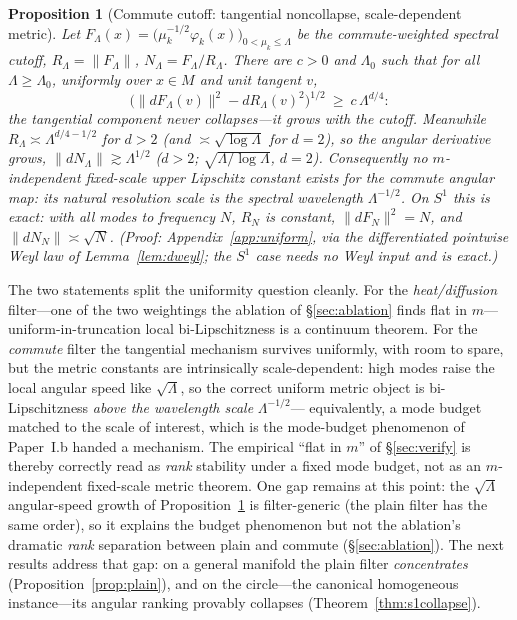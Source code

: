 \documentclass[11pt]{article}
\newtheorem{proposition}[theorem]{Proposition}
\theoremstyle{remark}
\begin{document}
\begin{proposition}[Commute cutoff: tangential noncollapse, scale-dependent metric]\label{prop:weyl}
Let $F_\Lambda(x)=\big(\mu_k^{-1/2}\varphi_k(x)\big)_{0<\mu_k\le\Lambda}$
be the commute-weighted spectral cutoff, $R_\Lambda=\lVert F_\Lambda\rVert$,
$N_\Lambda=F_\Lambda/R_\Lambda$. There are $c>0$ and $\Lambda_0$ such that for
all $\Lambda\ge\Lambda_0$, uniformly over $x\in M$ and unit tangent $v$,
\[
\big(\lVert dF_\Lambda(v)\rVert^2-dR_\Lambda(v)^2\big)^{1/2}\ \ge\ c\,\Lambda^{d/4}:
\]
the tangential component never collapses---it \emph{grows} with the cutoff.
Meanwhile $R_\Lambda\asymp\Lambda^{d/4-1/2}$ for $d>2$ (and
$\asymp\sqrt{\log\Lambda}$ for $d=2$), so the angular derivative grows,
$\lVert dN_\Lambda\rVert\gtrsim\Lambda^{1/2}$ ($d>2$;
$\sqrt{\Lambda/\log\Lambda}$, $d=2$). Consequently no $m$-independent
fixed-scale upper Lipschitz constant exists for the commute angular map: its
natural resolution scale is the spectral wavelength $\Lambda^{-1/2}$. On $S^1$
this is exact: with all modes to frequency $N$, $R_N$ is constant,
$\lVert dF_N\rVert^2=N$, and $\lVert dN_N\rVert\asymp\sqrt N$. (Proof:
Appendix~\ref{app:uniform}, via the differentiated pointwise Weyl law of
Lemma~\ref{lem:dweyl}; the $S^1$ case needs no Weyl input and is exact.)
\end{proposition}

The two statements split the uniformity question cleanly. For the
\emph{heat/diffusion} filter---one of the two weightings the ablation of
\S\ref{sec:ablation} finds flat in $m$---uniform-in-truncation local
bi-Lipschitzness is a continuum theorem. For the \emph{commute} filter the
tangential mechanism survives uniformly, with room to spare, but the metric
constants are intrinsically scale-dependent: high modes raise the local
angular speed like $\sqrt\Lambda$, so the correct uniform metric object is
bi-Lipschitzness \emph{above the wavelength scale} $\Lambda^{-1/2}$---
equivalently, a mode budget matched to the scale of interest, which is the
mode-budget phenomenon of Paper~I.b handed a mechanism. The
empirical ``flat in $m$'' of \S\ref{sec:verify} is thereby correctly read as
\emph{rank} stability under a fixed mode budget, not as an $m$-independent
fixed-scale metric theorem. One gap remains at this point: the $\sqrt\Lambda$
angular-speed growth of Proposition~\ref{prop:weyl} is filter-generic (the
plain filter has the same order), so it explains the budget phenomenon but
not the ablation's dramatic \emph{rank} separation between plain and commute
(\S\ref{sec:ablation}). The next results address that gap: on a general manifold
the plain filter \emph{concentrates} (Proposition~\ref{prop:plain}), and on the
circle---the canonical homogeneous instance---its angular ranking provably
collapses (Theorem~\ref{thm:s1collapse}).
\end{document}
